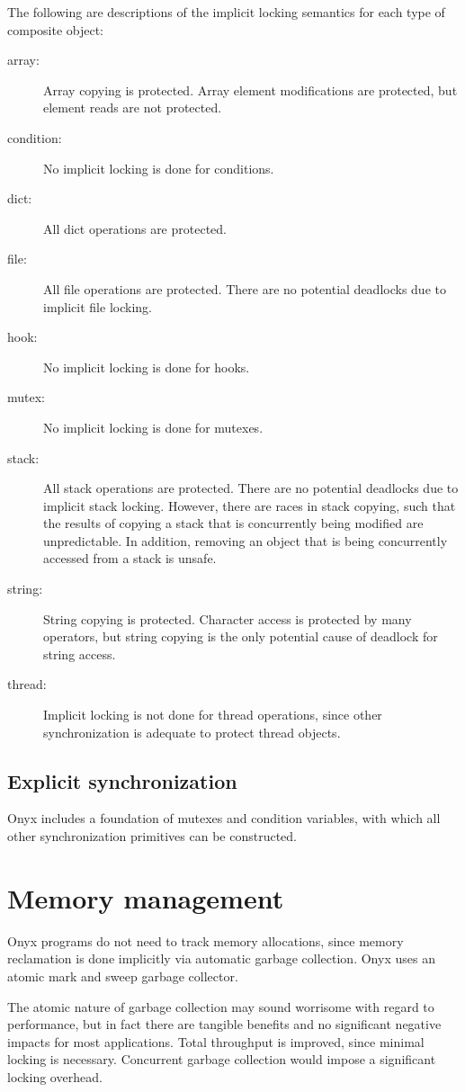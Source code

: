 The following are descriptions of the implicit locking semantics for each type
of composite object:
\begin{description}
\item[array: ] Array copying is protected.  Array element modifications are
protected, but element reads are not protected.
\item[condition: ] No implicit locking is done for conditions.
\item[dict: ] All dict operations are protected.
\item[file: ] All file operations are protected.  There are no potential
deadlocks due to implicit file locking.
\item[hook: ] No implicit locking is done for hooks.
\item[mutex: ] No implicit locking is done for mutexes.
\item[stack: ] All stack operations are protected.  There are no potential
deadlocks due to implicit stack locking.  However, there are races in stack
copying, such that the results of copying a stack that is concurrently being
modified are unpredictable.  In addition, removing an object that is being
concurrently accessed from a stack is unsafe.
\item[string: ] String copying is protected.  Character access is protected by
many operators, but string copying is the only potential cause of deadlock for
string access.
\item[thread: ]  Implicit locking is not done for thread operations, since other
synchronization is adequate to protect thread objects.
\end{description}

\subsection{Explicit synchronization}

Onyx includes a foundation of mutexes and condition variables, with which all
other synchronization primitives can be constructed.

\section{Memory management}
Onyx programs do not need to track memory allocations, since memory reclamation
is done implicitly via automatic garbage collection.  Onyx uses an atomic mark
and sweep garbage collector.

The atomic nature of garbage collection may sound worrisome with regard to
performance, but in fact there are tangible benefits and no significant negative
impacts for most applications.  Total throughput is improved, since minimal
locking is necessary.  Concurrent garbage collection would impose a significant
locking overhead.

